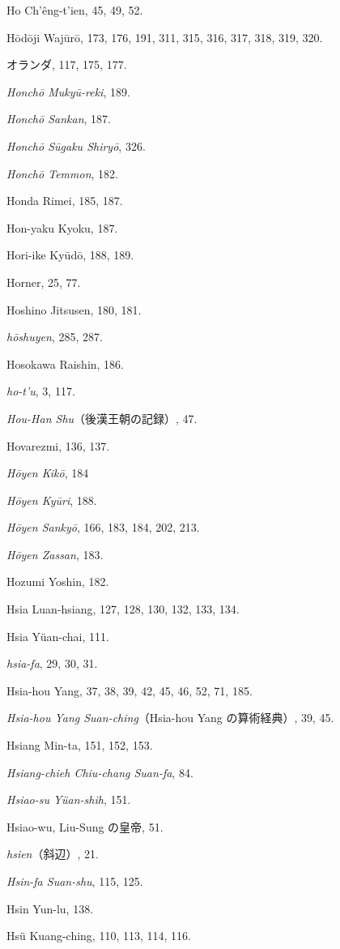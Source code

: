\documentclass[11pt]{article}
\newcommand{\scanpage}[2]{\clearpage\setcounter{footnote}{0}\noindent{\footnotesize\color{gray}PDF #1 頁 · #2}\par\medskip}
\begin{document}
\scanpage{0350}{印刷頁 336}
Ho Ch'êng-t'ien, 45, 49, 52.\par
Hōdōji Wajūrō, 173, 176, 191, 311, 315, 316, 317, 318, 319, 320.\par
オランダ, 117, 175, 177.\par
\emph{Honchō Mukyū-reki}, 189.\par
\emph{Honchō Sankan}, 187.\par
\emph{Honchō Sūgaku Shiryō}, 326.\par
\emph{Honchō Temmon}, 182.\par
Honda Rimei, 185, 187.\par
Hon-yaku Kyoku, 187.\par
Hori-ike Kyūdō, 188, 189.\par
Horner, 25, 77.\par
Hoshino Jitsusen, 180, 181.\par
\emph{hōshuyen}, 285, 287.\par
Hosokawa Raishin, 186.\par
\emph{ho-t'u}, 3, 117.\par
\emph{Hou-Han Shu}（後漢王朝の記録）, 47.\par
Hovarezmi, 136, 137.\par
\emph{Hōyen Kikō}, 184\par
\emph{Hōyen Kyūri}, 188.\par
\emph{Hōyen Sankyō}, 166, 183, 184, 202, 213.\par
\emph{Hōyen Zassan}, 183.\par
Hozumi Yoshin, 182.\par
Hsia Luan-hsiang, 127, 128, 130, 132, 133, 134.\par
Hsia Yüan-chai, 111.\par
\emph{hsia-fa}, 29, 30, 31.\par
Hsia-hou Yang, 37, 38, 39, 42, 45, 46, 52, 71, 185.\par
\emph{Hsia-hou Yang Suan-ching}（Hsia-hou Yang の算術経典）, 39, 45.\par
Hsiang Min-ta, 151, 152, 153.\par
\emph{Hsiang-chieh Chiu-chang Suan-fa}, 84.\par
\emph{Hsiao-su Yüan-shih}, 151.\par
Hsiao-wu, Liu-Sung の皇帝, 51.\par
\emph{hsien}（斜辺）, 21.\par
\emph{Hsin-fa Suan-shu}, 115, 125.\par
Hsin Yun-lu, 138.\par
Hsü Kuang-ching, 110, 113, 114, 116.\par
\end{document}
